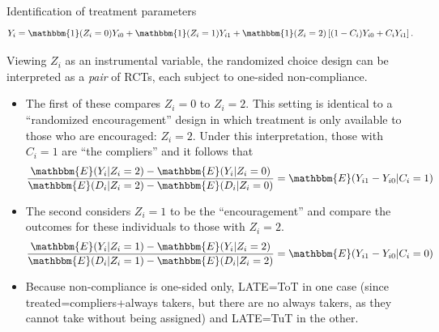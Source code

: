 \documentclass[8pt]{beamer}
\begin{document}
\begin{frame}{Identification of treatment parameters}
\label{identification_randomized_choice}
\begin{equation*}
    Y_i = \mathbbm{1}(Z_i =0) Y_{i0} + \mathbbm{1}(Z_i = 1)  Y_{i1}  + \mathbbm{1}(Z_i = 2) \left[(1 - C_i) Y_{i0} + C_i Y_{i1} \right].
\label{eq:potentialOutcomes}
\end{equation*}

    Viewing $Z_i$ as an instrumental variable, the randomized choice design can be interpreted as a \emph{pair} of RCTs, each subject to one-sided non-compliance. \\
    \begin{itemize}
        \item The first of these compares $Z_i=0$ to $Z_i = 2$.  This setting is identical to a ``randomized encouragement'' design in which treatment is only available to those who are encouraged: $Z_i = 2$. Under this interpretation, those with $C_i = 1$ are ``the compliers'' and it follows that 
\begin{equation*}
\frac{\mathbbm{E}(Y_i|Z_i=2) - \mathbbm{E}(Y_i|Z_i =0)}{\mathbbm{E}(D_i|Z_i=2)-\mathbbm{E}(D_i|Z_i=0)}  = \mathbbm{E}(Y_{i1} - Y_{i0}|C_i = 1)
\label{eq:ToT}
\end{equation*}

\item The second considers $Z_i = 1$ to be the ``encouragement'' and compare the outcomes for these individuals to those with $Z_i = 2$.
\begin{equation*}
\frac{\mathbbm{E}(Y_i|Z_i=1) - \mathbbm{E}(Y_i|Z_i =2)}{\mathbbm{E}(D_i|Z_i=1)-\mathbbm{E}(D_i|Z_i=2)}  = \mathbbm{E}(Y_{i1} - Y_{i0} | C_i = 0)
\label{eq:TuT}
\end{equation*}


\item Because non-compliance is one-sided only, LATE=ToT in one case (since treated=compliers+always takers, but there are no always takers, as they cannot take without being assigned) and LATE=TuT in the other.

\end{itemize}
\hyperlink{cc_design}{}


\end{frame}
\end{document}
